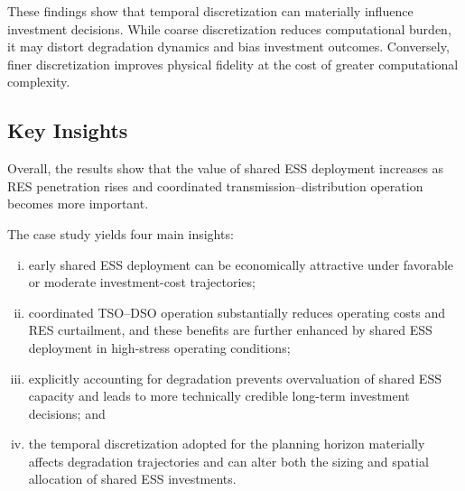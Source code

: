 \documentclass[preprint,12pt]{elsarticle}
\begin{document}
\begin{table}[htbp!]
    \centering
    \caption{Available capacity and SoH of the shared ESS in the 1-year discretization case.}
    \label{tab:cs3_shared_ess_specs_1year_discretization}
\end{table}

These findings show that temporal discretization can materially influence investment decisions. While coarse discretization reduces computational burden, it may distort degradation dynamics and bias investment outcomes. Conversely, finer discretization improves physical fidelity at the cost of greater computational complexity.

\subsection{Key Insights}

Overall, the results show that the value of shared ESS deployment increases as RES penetration rises and coordinated transmission--distribution operation becomes more important.

The case study yields four main insights:
\begin{enumerate}[(i)]
    \item early shared ESS deployment can be economically attractive under favorable or moderate investment-cost trajectories;
    \item coordinated TSO--DSO operation substantially reduces operating costs and RES curtailment, and these benefits are further enhanced by shared ESS deployment in high-stress operating conditions;
    \item explicitly accounting for degradation prevents overvaluation of shared ESS capacity and leads to more technically credible long-term investment decisions; and
    \item the temporal discretization adopted for the planning horizon materially affects degradation trajectories and can alter both the sizing and spatial allocation of shared ESS investments.
\end{enumerate}
\end{document}
